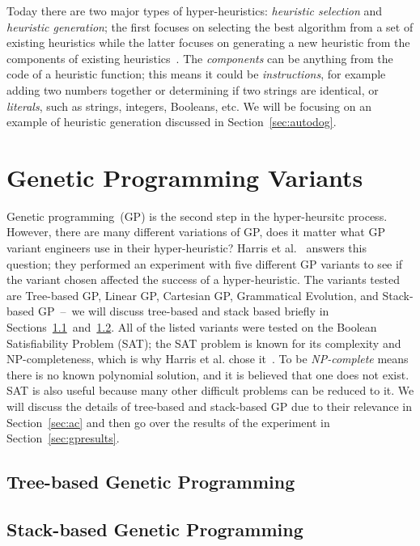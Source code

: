\documentclass{sig-alternate}
\begin{document}
Today there are two major types of hyper-heuristics: \textit{heuristic selection} and \textit{heuristic generation}; the first focuses on selecting the best algorithm from a set of existing heuristics while the latter focuses on generating a new heuristic from the components of existing heuristics~\cite{pappa:2014}. The \textit{components} can be anything from the code of a heuristic function; this means it could be \textit{instructions}, for example adding two numbers together or determining if two strings are identical, or \textit{literals}, such as strings, integers, Booleans, etc. We will be focusing on an example of heuristic generation discussed in Section~\ref{sec:autodog}.

\section{Genetic Programming Variants}
\label{sec:gpvariants}
Genetic programming~(GP) is the second step in the hyper-heursitc process. However, there are many different variations of GP, does it matter what GP variant engineers use in their hyper-heuristic? Harris et al.~\cite{harris:2015} answers this question; they performed an experiment with five different GP variants to see if the variant chosen affected the success of a hyper-heuristic. The variants tested are Tree-based GP, Linear GP, Cartesian GP, Grammatical Evolution, and Stack-based GP~--~we will discuss tree-based and stack based briefly in Sections~\ref{sec:tgp}~and~\ref{sec:sgp}. All of the listed variants were tested on the Boolean Satisfiability Problem (SAT); the SAT problem is known for its complexity and NP-completeness, which is why Harris et al. chose it~\cite{harris:2015}. To be \textit{NP-complete} means there is no known polynomial solution, and it is believed that one does not exist. SAT is also useful because many other difficult problems can be reduced to it. We will discuss the details of tree-based and stack-based GP due to their relevance in Section~\ref{sec:ac} and then go over the results of the experiment in Section~\ref{sec:gpresults}.

\subsection{Tree-based Genetic Programming}
\label{sec:tgp}

\subsection{Stack-based Genetic Programming}
\label{sec:sgp}
\end{document}
